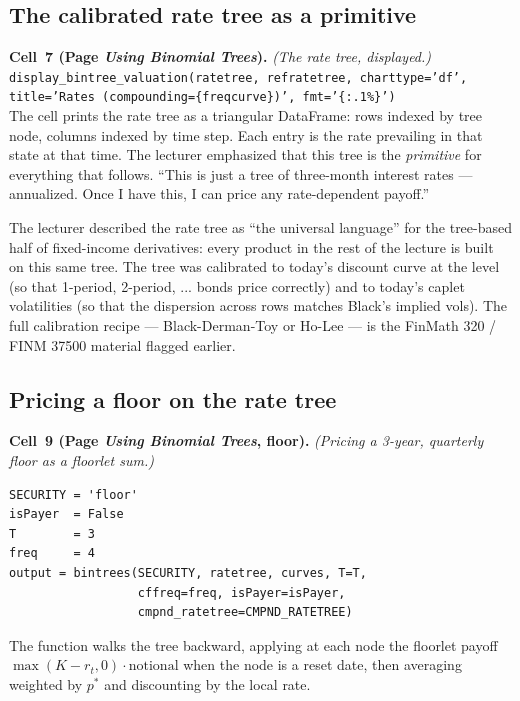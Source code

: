 \subsection{The calibrated rate tree as a primitive}\label{L8-sec:ratetreeprim}

\begin{keyblock}
\textbf{Cell~7 (Page \emph{Using Binomial Trees}).}
\emph{(The rate tree, displayed.)}\\
\texttt{display\_bintree\_valuation(ratetree, refratetree, charttype='df',
title='Rates (compounding=\{freqcurve\})', fmt='\{:.1\%\}')}\\
The cell prints the rate tree as a triangular DataFrame: rows indexed
by tree node, columns indexed by time step. Each entry is the rate
prevailing in that state at that time. The lecturer emphasized that
this tree is the \emph{primitive} for everything that follows.
``This is just a tree of three-month interest rates --- annualized.
Once I have this, I can price any rate-dependent payoff.''
\end{keyblock}

The lecturer described the rate tree as ``the universal language''
for the tree-based half of fixed-income derivatives: every product
in the rest of the lecture is built on this same tree. The tree was
calibrated to today's discount curve at the level (so that
1-period, 2-period, ... bonds price correctly) and to today's caplet
volatilities (so that the dispersion across rows matches Black's
implied vols). The full calibration recipe --- Black-Derman-Toy or
Ho-Lee --- is the FinMath 320 / FINM 37500 material flagged earlier.

\subsection{Pricing a floor on the rate tree}\label{L8-sec:floortree}

\begin{keyblock}
\textbf{Cell~9 (Page \emph{Using Binomial Trees}, floor).}
\emph{(Pricing a 3-year, quarterly floor as a floorlet sum.)}
\begin{verbatim}
SECURITY = 'floor'
isPayer  = False
T        = 3
freq     = 4
output = bintrees(SECURITY, ratetree, curves, T=T,
                  cffreq=freq, isPayer=isPayer,
                  cmpnd_ratetree=CMPND_RATETREE)
\end{verbatim}
The function walks the tree backward, applying at each node the
floorlet payoff $\max(K - r_t, 0) \cdot \text{notional}$ when the
node is a reset date, then averaging weighted by $p^*$ and
discounting by the local rate.
\end{keyblock}

